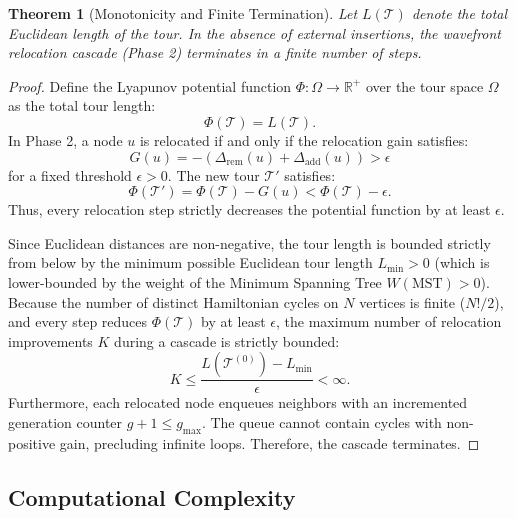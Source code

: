 \documentclass{article}
\newtheorem{theorem}{Theorem}
\theoremstyle{definition}
\begin{document}
\begin{theorem}[Monotonicity and Finite Termination]
Let $L(\mathcal{T})$ denote the total Euclidean length of the tour. In the absence of external insertions, the wavefront relocation cascade (Phase 2) terminates in a finite number of steps.
\end{theorem}
\begin{proof}
Define the Lyapunov potential function $\Phi: \Omega \to \mathbb{R}^+$ over the tour space $\Omega$ as the total tour length:
\begin{equation}
\Phi(\mathcal{T}) = L(\mathcal{T}).
\end{equation}
In Phase 2, a node $u$ is relocated if and only if the relocation gain satisfies:
\begin{equation}
G(u) = -(\Delta_{\text{rem}}(u) + \Delta_{\text{add}}(u)) > \epsilon
\end{equation}
for a fixed threshold $\epsilon > 0$. The new tour $\mathcal{T}'$ satisfies:
\begin{equation}
\Phi(\mathcal{T}') = \Phi(\mathcal{T}) - G(u) < \Phi(\mathcal{T}) - \epsilon.
\end{equation}
Thus, every relocation step strictly decreases the potential function by at least $\epsilon$.

Since Euclidean distances are non-negative, the tour length is bounded strictly from below by the minimum possible Euclidean tour length $L_{\min} > 0$ (which is lower-bounded by the weight of the Minimum Spanning Tree $W(\text{MST}) > 0$). Because the number of distinct Hamiltonian cycles on $N$ vertices is finite ($N!/2$), and every step reduces $\Phi(\mathcal{T})$ by at least $\epsilon$, the maximum number of relocation improvements $K$ during a cascade is strictly bounded:
\begin{equation}
K \le \frac{L(\mathcal{T}^{(0)}) - L_{\min}}{\epsilon} < \infty.
\end{equation}
Furthermore, each relocated node enqueues neighbors with an incremented generation counter $g + 1 \le g_{\max}$. The queue cannot contain cycles with non-positive gain, precluding infinite loops. Therefore, the cascade terminates.
\end{proof}

\subsection{Computational Complexity}
\end{document}
